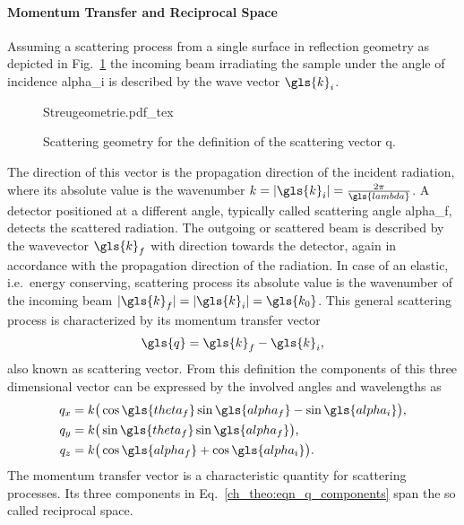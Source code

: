 \paragraph{Momentum Transfer and Reciprocal Space}
Assuming a scattering process from a single surface in reflection geometry as depicted in Fig.~\ref{ch_theo:fig_scattering_process} the incoming beam irradiating the sample under the angle of incidence \gls{alpha_i} is described by the wave vector $\gls{k}_i$.
\begin{figure}[htb]
    {Streugeometrie.pdf_tex}
    \caption[Scattering geometry and definition of the scattering vector.]{Scattering geometry for the definition of the scattering vector \gls{q}.}
    \label{ch_theo:fig_scattering_process}
\end{figure}
The direction of this vector is the propagation direction of the incident radiation, where its absolute value is the wavenumber $k = |\gls{k}_i| = \frac{2 \pi}{\gls{lambda}}$. A detector positioned at a different angle, typically called scattering angle \gls{alpha_f}, detects the scattered radiation. The outgoing or scattered beam is described by the wavevector $\gls{k}_f$ with direction towards the detector, again in accordance with the propagation direction of the radiation. In case of an elastic, i.e.~energy conserving, scattering process its absolute value is the wavenumber of the incoming beam $|\gls{k}_f| = |\gls{k}_i| = \gls{k_0}$. This general scattering process is characterized by its momentum transfer vector 
\begin{align}
\gls{q} = \gls{k}_f - \gls{k}_i\text{,} \label{ch:theo_eqn:q}
\end{align}
also known as scattering vector. From this definition the components of this three dimensional vector can be expressed by the involved angles and wavelengths as
\begin{align}\begin{split}
q_x &= k \big( \cos \gls{theta_f} \sin \gls{alpha_f} - \sin \gls{alpha_i}\big)\text{,}\\
q_y &= k \big( \sin \gls{theta_f} \sin \gls{alpha_f}\big)\text{,}\\
q_z &= k \big( \cos \gls{alpha_f} + \cos \gls{alpha_i}\big)\text{.}
\end{split} \label{ch_theo:eqn_q_components}
\end{align}
The momentum transfer vector is a characteristic quantity for scattering processes. Its three components in Eq.~\eqref{ch_theo:eqn_q_components} span the so called reciprocal space.

